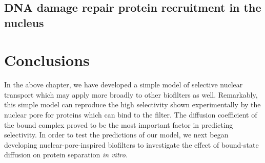 \subsection{DNA damage repair protein recruitment in the nucleus}

\section{Conclusions}

In the above chapter, we have developed a simple model of selective nuclear transport which may apply more broadly to other biofilters as well.  Remarkably, this simple model can reproduce the high selectivity shown experimentally by the nuclear pore for proteins which can bind to the filter.  The diffusion coefficient of the bound complex proved to be the most important factor in predicting selectivity.  In order to test the predictions of our model, we next began developing nuclear-pore-inspired biofilters to investigate the effect of bound-state diffusion on protein separation \textit{in vitro}.
